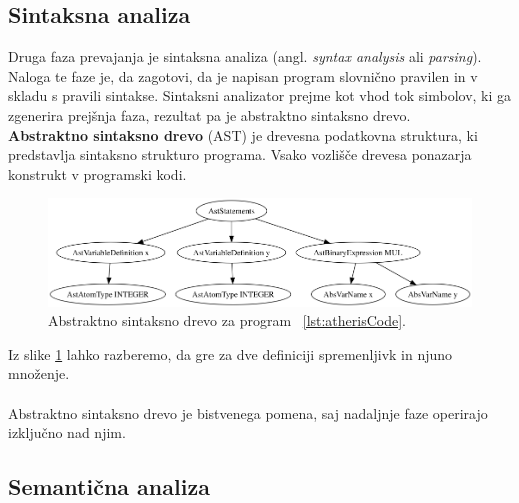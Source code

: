 \documentclass[a4paper, 12p]{book}
\begin{document}
\subsection{Sintaksna analiza}

Druga faza prevajanja je sintaksna analiza (angl. \textit{syntax analysis} ali \textit{parsing}). Naloga te faze je, da zagotovi, da je napisan program slovnično pravilen in v skladu s pravili sintakse. Sintaksni analizator prejme kot vhod tok simbolov, ki ga zgenerira prejšnja faza, rezultat pa je abstraktno sintaksno drevo. \\

\noindent\textbf{Abstraktno sintaksno drevo} (AST) je drevesna podatkovna struktura, ki predstavlja sintaksno strukturo programa. Vsako vozlišče drevesa ponazarja konstrukt v programski kodi.

\begin{figure}[h]
	\begin{center}
		\includegraphics[width=1\textwidth]{resources/ast.png}
	\end{center}
	\caption{Abstraktno sintaksno drevo za program ~\ref{lst:atherisCode}.}
	\label{image:abstractSyntaxTree}
\end{figure}

Iz slike \ref{image:abstractSyntaxTree} lahko razberemo, da gre za dve definiciji spremenljivk in njuno množenje.\\\\
\indent Abstraktno sintaksno drevo je bistvenega pomena, saj nadaljnje faze operirajo izključno nad njim.

\subsection{Semantična analiza} \label{semanSection}
\end{document}
